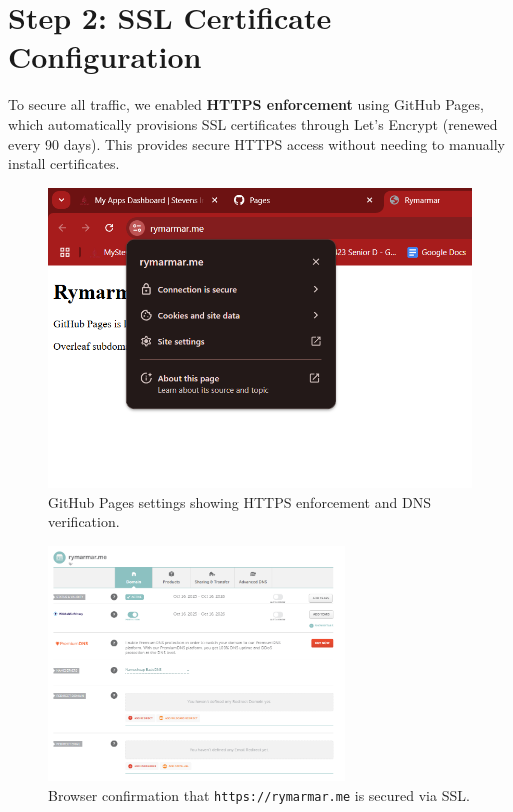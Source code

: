 \section{Step 2: SSL Certificate Configuration}
To secure all traffic, we enabled \textbf{HTTPS enforcement} using GitHub Pages, which automatically provisions SSL certificates through Let’s Encrypt (renewed every 90 days).  
This provides secure HTTPS access without needing to manually install certificates.

\begin{figure}[H]
    \centering
    \includegraphics[width=\textwidth]{png/DomainNames/Enforce_HTTPS.png}
    \caption{GitHub Pages settings showing HTTPS enforcement and DNS verification.}
\end{figure}

\begin{figure}[H]
    \centering
    \includegraphics[width=0.7\textwidth]{png/DomainNames/domain_secured.png}
    \caption{Browser confirmation that \texttt{https://rymarmar.me} is secured via SSL.}
\end{figure}

